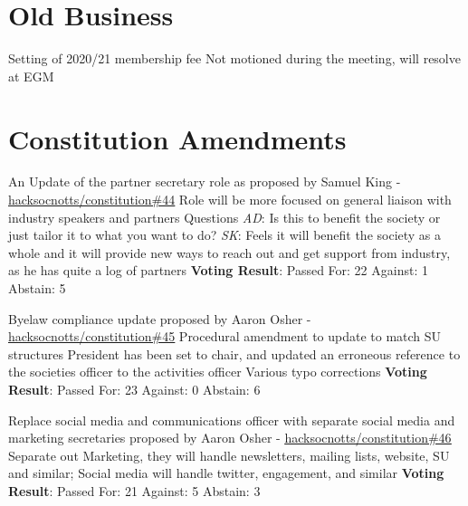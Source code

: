 \documentclass[11pt]{meetingmins}
\begin{document}
\section{Old Business}
\begin{items}
	\item
	Setting of 2020/21 membership fee
		\subitem
		Not motioned during the meeting, will resolve at EGM
\end{items}

\section{Constitution Amendments}
\begin{items}
	\item
	An Update of the partner secretary role as proposed by Samuel King - \underline{\href{https://github.com/HackSocNotts/constitution/pull/44}{hacksocnotts/constitution\#44}}
		\subitem
		Role will be more focused on general liaison with industry speakers and partners 
		\subitem
		Questions
			\subsubitem
			\textit{AD}: Is this to benefit the society or just tailor it to what you want to do?
			\subsubitem
			\textit{SK}: Feels it will benefit the society as a whole and it will provide new ways to reach out and get support from industry, as he has quite a log of partners
		\subitem
		\textbf{Voting Result}: Passed
			\subsubitem
			For: 22
			\subsubitem
			Against: 1
			\subsubitem
			Abstain: 5
			
	\item
	Byelaw compliance update proposed by Aaron Osher - \underline{\href{https://github.com/HackSocNotts/constitution/pull/45}{hacksocnotts/constitution\#45}}
		\subitem
		Procedural amendment to update to match SU structures
		\subitem
		President has been set to chair, and updated an erroneous reference to the societies officer to the activities officer
		\subitem
		Various typo corrections
		\subitem
		\textbf{Voting Result}: Passed
			\subsubitem
			For: 23
			\subsubitem
			Against: 0
			\subsubitem
			Abstain: 6
	
	\item
	Replace social media and communications officer with separate social media and marketing secretaries proposed by Aaron Osher - \underline{\href{https://github.com/HackSocNotts/constitution/pull/46}{hacksocnotts/constitution\#46}}
		\subitem
		Separate out Marketing, they will handle newsletters, mailing lists, website, SU and similar; Social media will handle twitter, engagement, and similar
		\subitem
		\textbf{Voting Result}: Passed
			\subsubitem
			For: 21
			\subsubitem
			Against: 5
			\subsubitem
			Abstain: 3

\end{items}
\end{document}
